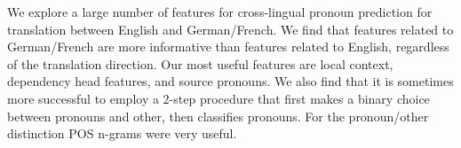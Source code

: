 We explore a large number of features for cross-lingual pronoun prediction for translation between English and German/French. We find that features related to German/French are more informative than features related to English, regardless of the translation direction. Our most useful features are local context, dependency head features, and source pronouns. We also find that it is sometimes more successful to employ a 2-step procedure that first makes a binary choice between pronouns and other, then classifies pronouns. For the pronoun/other distinction POS n-grams were very useful.
